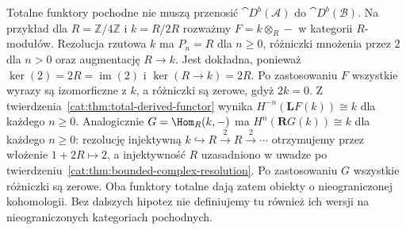 \begin{uwaga}
Totalne funktory pochodne nie muszą przenosić $\cat D^b(\mathcal A)$ do $\cat D^b(\mathcal B)$. Na przykład dla $R=\mathbb Z/4\mathbb Z$ i $k=R/2R$ rozważmy $F=k\otimes_R-$ w kategorii $R$-modułów. Rezolucja rzutowa $k$ ma $P_n=R$ dla $n\ge0$, różniczki mnożenia przez $2$ dla $n>0$ oraz augmentację $R\to k$. Jest dokładna, ponieważ $\ker(2)=2R=\operatorname{im}(2)$ i $\ker(R\to k)=2R$. Po zastosowaniu $F$ wszystkie wyrazy są izomorficzne z $k$, a różniczki są zerowe, gdyż $2k=0$. Z twierdzenia~\ref{cat:thm:total-derived-functor} wynika $H^{-n}(\mathbf L F(k))\cong k$ dla każdego $n\ge0$. Analogicznie $G=\Hom_R(k,-)$ ma $H^n(\mathbf R G(k))\cong k$ dla każdego $n\ge0$: rezolucję injektywną $k\hookrightarrow R\xrightarrow{2}R\xrightarrow{2}\cdots$ otrzymujemy przez włożenie $1+2R\mapsto2$, a injektywność $R$ uzasadniono w uwadze po twierdzeniu~\ref{cat:thm:bounded-complex-resolution}. Po zastosowaniu $G$ wszystkie różniczki są zerowe. Oba funktory totalne dają zatem obiekty o nieograniczonej kohomologii. Bez dalszych hipotez nie definiujemy tu również ich wersji na nieograniczonych kategoriach pochodnych.
\end{uwaga}

